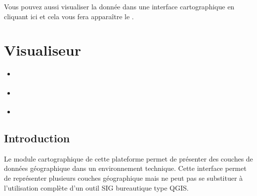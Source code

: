 \documentclass[letterpaper,10pt,french]{sphinxmanual}
\let\sphinxpxdimen\pdfpxdimen\else\newdimen\sphinxpxdimen
\begin{document}
\sphinxAtStartPar
Vous pouvez aussi visualiser la donnée dans une interface cartographique en cliquant ici et cela vous fera apparaître le {\hyperref[\detokenize{doc_user/visualiseur:id1}]{}}.

\noindent{\hspace*{\fill}\sphinxincludegraphics[width=600\sphinxpxdimen]{{fiche_carto}.png}\hspace*{\fill}}

\sphinxstepscope


\section{Visualiseur}
\label{\detokenize{doc_user/visualiseur:visualiseur}}\label{\detokenize{doc_user/visualiseur::doc}}\label{\detokenize{doc_user/visualiseur:id1}}
\begin{sphinxShadowBox}
\begin{itemize}
\item {} 
\sphinxAtStartPar
{}\label{\detokenize{doc_user/visualiseur:id2}}{\hyperref[\detokenize{doc_user/visualiseur:introduction}]{}}

\item {} 
\sphinxAtStartPar
{}\label{\detokenize{doc_user/visualiseur:id3}}{\hyperref[\detokenize{doc_user/visualiseur:la-gestion-des-couches}]{}}

\item {} 
\sphinxAtStartPar
{}\label{\detokenize{doc_user/visualiseur:id4}}{\hyperref[\detokenize{doc_user/visualiseur:les-fonctionnalites-techniques}]{}}

\end{itemize}
\end{sphinxShadowBox}


\subsection{Introduction}
\label{\detokenize{doc_user/visualiseur:introduction}}
\sphinxAtStartPar
Le module cartographique de cette plateforme permet de présenter des couches de données géographique dans un environnement technique.
Cette interface permet de représenter plusieurs couches géographique mais ne peut pas se substituer à l’utilisation complète d’un outil SIG bureautique type QGIS.
\end{document}
